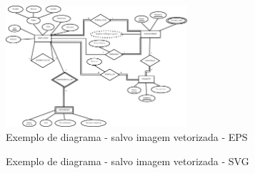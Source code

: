 \begin{figure}
    \centering
    \caption{Exemplo de diagrama - salvo imagem vetorizada - EPS}
    \label{fig:uml_dia_vetorizado_eps}
	\includegraphics[width=0.6\textwidth]{exemplos/diagramas/ER.eps}
\end{figure}

\begin{figure}
    \centering
    \caption{Exemplo de diagrama - salvo imagem vetorizada - SVG}
    \label{fig:uml_dia_vetorizado_svg}
    
\end{figure}




